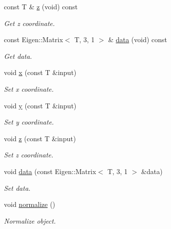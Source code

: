 \begin{DoxyCompactItemize}
const T \& \hyperlink{classddd_1_1vector_a6f9a297e7ba387597ca0515421012166}{z} (void) const
\begin{DoxyCompactList}\small\item\em Get z coordinate. \end{DoxyCompactList}\item 
\mbox{\label{classddd_1_1vector_a6d11c684bb82ca9f62973305048b601b}} 
const Eigen\+::\+Matrix$<$ T, 3, 1 $>$ \& \hyperlink{classddd_1_1vector_a6d11c684bb82ca9f62973305048b601b}{data} (void) const
\begin{DoxyCompactList}\small\item\em Get data. \end{DoxyCompactList}\item 
void \hyperlink{classddd_1_1vector_a3a431ffa7d2681cf26f6b2dd5052de65}{x} (const T \&input)
\begin{DoxyCompactList}\small\item\em Set x coordinate. \end{DoxyCompactList}\item 
void \hyperlink{classddd_1_1vector_a516506aadad05ec33fca8e01a63ab19f}{y} (const T \&input)
\begin{DoxyCompactList}\small\item\em Set y coordinate. \end{DoxyCompactList}\item 
void \hyperlink{classddd_1_1vector_a998ea9276d8f3c706b98d4eab9ebcaf3}{z} (const T \&input)
\begin{DoxyCompactList}\small\item\em Set z coordinate. \end{DoxyCompactList}\item 
void \hyperlink{classddd_1_1vector_a207ab0fdad2166078057b772edce8d0e}{data} (const Eigen\+::\+Matrix$<$ T, 3, 1 $>$ \&data)
\begin{DoxyCompactList}\small\item\em Set data. \end{DoxyCompactList}\item 
\mbox{\label{classddd_1_1vector_aeff69a088496a7c9295b30b1c928df70}} 
void \hyperlink{classddd_1_1vector_aeff69a088496a7c9295b30b1c928df70}{normalize} ()
\begin{DoxyCompactList}\small\item\em Normalize object. \end{DoxyCompactList}\item 

\end{DoxyCompactItemize}
